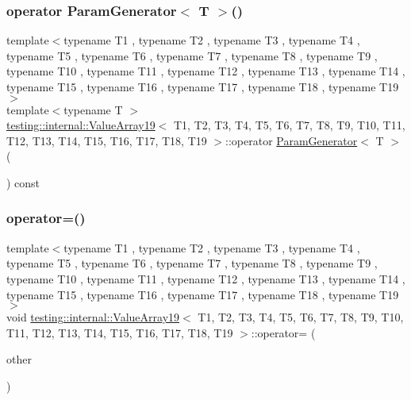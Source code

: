 \subsubsection{\texorpdfstring{operator ParamGenerator$<$ T $>$()}{operator ParamGenerator< T >()}}
{\footnotesize\ttfamily template$<$typename T1 , typename T2 , typename T3 , typename T4 , typename T5 , typename T6 , typename T7 , typename T8 , typename T9 , typename T10 , typename T11 , typename T12 , typename T13 , typename T14 , typename T15 , typename T16 , typename T17 , typename T18 , typename T19 $>$ \\
template$<$typename T $>$ \\
\mbox{\hyperlink{classtesting_1_1internal_1_1_value_array19}{testing\+::internal\+::\+Value\+Array19}}$<$ T1, T2, T3, T4, T5, T6, T7, T8, T9, T10, T11, T12, T13, T14, T15, T16, T17, T18, T19 $>$\+::operator \mbox{\hyperlink{classtesting_1_1internal_1_1_param_generator}{Param\+Generator}}$<$ T $>$ (\begin{DoxyParamCaption}{ }\end{DoxyParamCaption}) const\hspace{0.3cm}{\ttfamily [inline]}}

\mbox{\label{classtesting_1_1internal_1_1_value_array19_ae7dce5c33d0426de645afd700e1d432d}} 
\subsubsection{\texorpdfstring{operator=()}{operator=()}}
{\footnotesize\ttfamily template$<$typename T1 , typename T2 , typename T3 , typename T4 , typename T5 , typename T6 , typename T7 , typename T8 , typename T9 , typename T10 , typename T11 , typename T12 , typename T13 , typename T14 , typename T15 , typename T16 , typename T17 , typename T18 , typename T19 $>$ \\
void \mbox{\hyperlink{classtesting_1_1internal_1_1_value_array19}{testing\+::internal\+::\+Value\+Array19}}$<$ T1, T2, T3, T4, T5, T6, T7, T8, T9, T10, T11, T12, T13, T14, T15, T16, T17, T18, T19 $>$\+::operator= (\begin{DoxyParamCaption}\item[{const \mbox{\hyperlink{classtesting_1_1internal_1_1_value_array19}{Value\+Array19}}$<$ T1, T2, T3, T4, T5, T6, T7, T8, T9, T10, T11, T12, T13, T14, T15, T16, T17, T18, T19 $>$ \&}]{other }\end{DoxyParamCaption})\hspace{0.3cm}{\ttfamily [private]}}



